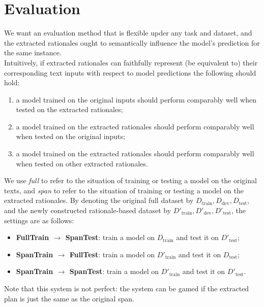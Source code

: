 \section{Evaluation}

We want an evaluation method that is flexible upder any task and dataset, and
the extracted rationales ought to semantically influence the model's prediction
for the same instance.\\
Intuitively, if extracted rationales can faithfully represent (be equivalent to)
their corresponding text inputs with respect to model predictions the following
should hold:
\begin{enumerate}
    \item a model trained on the original inputs should perform comparably well
        when tested on the extracted rationales;

    \item a model trained on the extracted rationales should perform comparably
        well when tested on the original inputs;

    \item a model trained on the extracted rationales should perform comparably
    well when tested on other extracted rationales.
\end{enumerate}

We use \textit{full} to refer to the situation of training or testing a model on
the original texts, and \textit{span} to refer to the situation of training or
testing a model on the extracted rationales. By denoting the original full
dataset by $D_{\text{train}}, D_{\text{dev}}, D_{\text{test}}$, and the newly
constructed rationale-based dataset by $D'_{\text{train}}, D'_{\text{dev}},
D'_{\text{test}}$, the settings are as follows:

\begin{itemize}
    \item \textbf{FullTrain $\rightarrow$ SpanTest}: train a model on
        $D_{\text{train}}$ and test it on $D'_{\text{test}}$;

    \item \textbf{SpanTrain $\rightarrow$ FullTest}: train a model on
        $D'_{\text{train}}$ and test it on $D_{\text{test}}$;

    \item \textbf{SpanTrain $\rightarrow$ SpanTest}: train a model on
        $D'_{\text{train}}$ and test it on $D'_{\text{test}}$.
\end{itemize}

Note that this system is not perfect: the system can be gamed if the extracted
plan is just the same as the original span.
